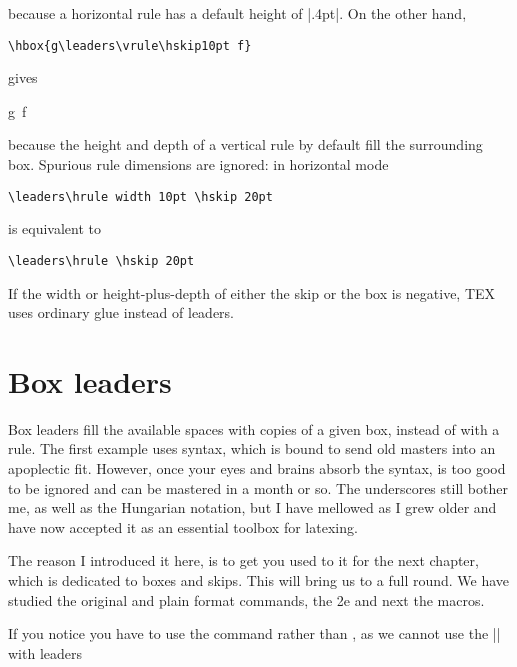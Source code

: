 because a horizontal rule has a default height of |.4pt|. On the other hand,

\verb+\hbox{g\leaders\vrule\hskip10pt f}+

gives

\hbox{g\leaders\vrule\hskip10pt f}

because the height and depth of a vertical rule by default fill the surrounding box.
Spurious rule dimensions are ignored: in horizontal mode

\verb+\leaders\hrule width 10pt \hskip 20pt+

is equivalent to

\verb+\leaders\hrule \hskip 20pt+

If the width or height-plus-depth of either the skip or the box is negative, TEX uses ordinary glue
instead of leaders.

\section{Box leaders}
Box leaders fill the available spaces with copies of a given box, instead of with a rule. The first example uses  syntax, which is bound to send old \tex masters into an apoplectic fit. However, once your eyes
and brains absorb the syntax,  is too good to be ignored and can be mastered in a month or so. The
underscores still bother me, as well as the Hungarian notation, but I have mellowed as I grew older and
have now accepted it as an essential toolbox for latexing.

The reason I introduced it here, is to get you used to it for the next chapter, which is dedicated to  boxes and skips. This will bring us to a full round. We have studied the original \tex and plain format commands, the \latex2e and next the  macros. 

\begin{texexample}{Box leaders}{}
\ExplSyntaxOn  
  \box_new:N \starbox
  \hbox_set:Nn \starbox 
    {
      \skip_horizontal:n { .2em  }
      \box_move_down:nn { 2.5pt }
                        {\hbox:n{*}}
      \skip_horizontal:n {.2em}
    }

  
  \hbox_to_wd:nn {\textwidth} 
    {
       \null \tex_leaders:D\box_use:N \starbox \hfill \null
    }.
\ExplSyntaxOff
\end{texexample}

If you notice you have to use the  command rather than , as we cannot use the |\leavevmode| with leaders

